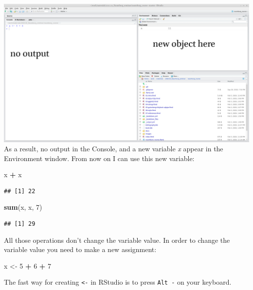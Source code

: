 \documentclass[
]{book}
\newenvironment{Shaded}{\begin{snugshade}}{\end{snugshade}}
\newcommand{\DecValTok}[1]{\textcolor[rgb]{0.00,0.00,0.81}{#1}}
\newcommand{\KeywordTok}[1]{\textcolor[rgb]{0.13,0.29,0.53}{\textbf{#1}}}
\newcommand{\NormalTok}[1]{#1}
\newcommand{\OperatorTok}[1]{\textcolor[rgb]{0.81,0.36,0.00}{\textbf{#1}}}
\newcommand{\StringTok}[1]{\textcolor[rgb]{0.31,0.60,0.02}{#1}}
\begin{document}
\includegraphics{images/01.04.variable.png}
As a result, no output in the Console, and a new variable \emph{x} appear in the Environment window. From now on I can use this new variable:

\begin{Shaded}
\begin{Highlighting}[]
\NormalTok{x }\OperatorTok{+}\StringTok{ }\NormalTok{x}
\end{Highlighting}
\end{Shaded}

\begin{verbatim}
## [1] 22
\end{verbatim}

\begin{Shaded}
\begin{Highlighting}[]
\KeywordTok{sum}\NormalTok{(x, x, }\DecValTok{7}\NormalTok{)}
\end{Highlighting}
\end{Shaded}

\begin{verbatim}
## [1] 29
\end{verbatim}

All those operations don't change the variable value. In order to change the variable value you need to make a new assignment:

\begin{Shaded}
\begin{Highlighting}[]
\NormalTok{x <-}\StringTok{ }\DecValTok{5} \OperatorTok{+}\StringTok{ }\DecValTok{6} \OperatorTok{+}\StringTok{ }\DecValTok{7}
\end{Highlighting}
\end{Shaded}

The fast way for creating \texttt{\textless{}-} in RStudio is to press \texttt{Alt\ -} on your keyboard.
\end{document}
